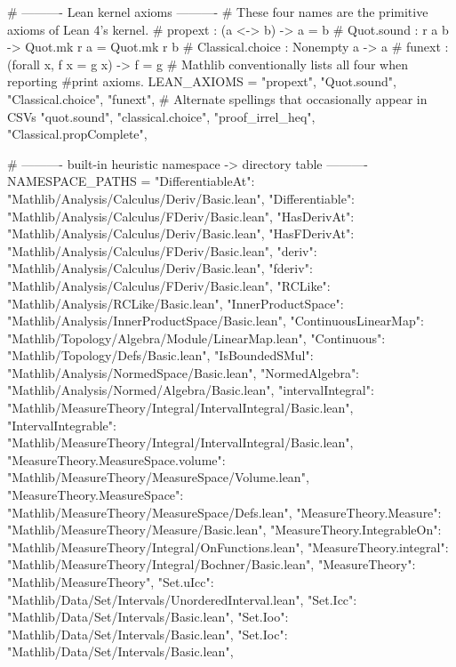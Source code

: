 \documentclass[11pt,reqno]{amsart}
\begin{document}
\begin{verbatimbox}
# ---------- Lean kernel axioms ----------
# These four names are the primitive axioms of Lean 4's kernel.
#   propext          : (a <-> b) -> a = b
#   Quot.sound       : r a b -> Quot.mk r a = Quot.mk r b
#   Classical.choice : Nonempty a -> a
#   funext           : (forall x, f x = g x) -> f = g
# Mathlib conventionally lists all four when reporting #print axioms.
LEAN_AXIOMS = {
	"propext",
	"Quot.sound",
	"Classical.choice",
	"funext",
	# Alternate spellings that occasionally appear in CSVs
	"quot.sound",
	"classical.choice",
	"proof_irrel_heq",
	"Classical.propComplete",
}

# ---------- built-in heuristic namespace -> directory table ----------
NAMESPACE_PATHS = {
	"DifferentiableAt":             "Mathlib/Analysis/Calculus/Deriv/Basic.lean",
	"Differentiable":               "Mathlib/Analysis/Calculus/FDeriv/Basic.lean",
	"HasDerivAt":                   "Mathlib/Analysis/Calculus/Deriv/Basic.lean",
	"HasFDerivAt":                  "Mathlib/Analysis/Calculus/FDeriv/Basic.lean",
	"deriv":                        "Mathlib/Analysis/Calculus/Deriv/Basic.lean",
	"fderiv":                       "Mathlib/Analysis/Calculus/FDeriv/Basic.lean",
	"RCLike":                       "Mathlib/Analysis/RCLike/Basic.lean",
	"InnerProductSpace":            "Mathlib/Analysis/InnerProductSpace/Basic.lean",
	"ContinuousLinearMap":          "Mathlib/Topology/Algebra/Module/LinearMap.lean",
	"Continuous":                   "Mathlib/Topology/Defs/Basic.lean",
	"IsBoundedSMul":                "Mathlib/Analysis/NormedSpace/Basic.lean",
	"NormedAlgebra":                "Mathlib/Analysis/Normed/Algebra/Basic.lean",
	"intervalIntegral":             "Mathlib/MeasureTheory/Integral/IntervalIntegral/Basic.lean",
	"IntervalIntegrable":           "Mathlib/MeasureTheory/Integral/IntervalIntegral/Basic.lean",
	"MeasureTheory.MeasureSpace.volume":
	"Mathlib/MeasureTheory/MeasureSpace/Volume.lean",
	"MeasureTheory.MeasureSpace":   "Mathlib/MeasureTheory/MeasureSpace/Defs.lean",
	"MeasureTheory.Measure":        "Mathlib/MeasureTheory/Measure/Basic.lean",
	"MeasureTheory.IntegrableOn":   "Mathlib/MeasureTheory/Integral/OnFunctions.lean",
	"MeasureTheory.integral":       "Mathlib/MeasureTheory/Integral/Bochner/Basic.lean",
	"MeasureTheory":                "Mathlib/MeasureTheory",
	"Set.uIcc":                     "Mathlib/Data/Set/Intervals/UnorderedInterval.lean",
	"Set.Icc":                      "Mathlib/Data/Set/Intervals/Basic.lean",
	"Set.Ioo":                      "Mathlib/Data/Set/Intervals/Basic.lean",
	"Set.Ioc":                      "Mathlib/Data/Set/Intervals/Basic.lean",
}
\end{verbatimbox}
\end{document}
